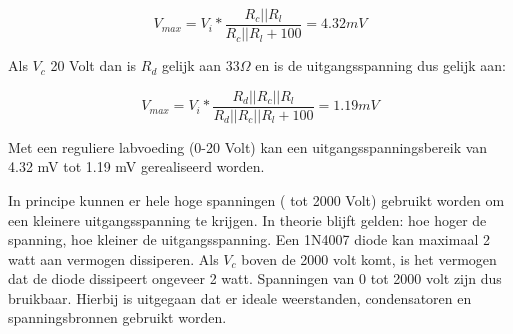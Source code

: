\documentclass{report}
\begin{document}
$$
\label{eq:maximaalVoltage}
V_{max} = V_i * \frac{R_c||R_l}{R_c||R_l + 100} = 4.32 mV
$$

Als $V_c$ 20 Volt dan is $R_d$ gelijk aan $33\Omega$ en is de uitgangsspanning dus gelijk aan: 

$$
\label{eq:maximaalVoltage}
V_{max} = V_i * \frac{R_d||R_c||R_l}{R_d||R_c||R_l + 100} = 1.19 mV
$$

Met een reguliere labvoeding (0-20 Volt) kan een uitgangsspanningsbereik van 4.32 mV tot 1.19 mV gerealiseerd worden.

In principe kunnen er hele hoge spanningen ( tot 2000 Volt) gebruikt worden om een kleinere uitgangsspanning te krijgen. In theorie blijft gelden: hoe hoger de spanning, hoe kleiner de uitgangsspanning. Een 1N4007 diode kan maximaal 2 watt aan vermogen dissiperen. Als $V_c$ boven de 2000 volt komt, is het vermogen dat de diode dissipeert ongeveer 2 watt. Spanningen van 0 tot 2000 volt zijn dus bruikbaar. Hierbij is uitgegaan dat er ideale weerstanden, condensatoren en spanningsbronnen gebruikt worden.
\end{document}
